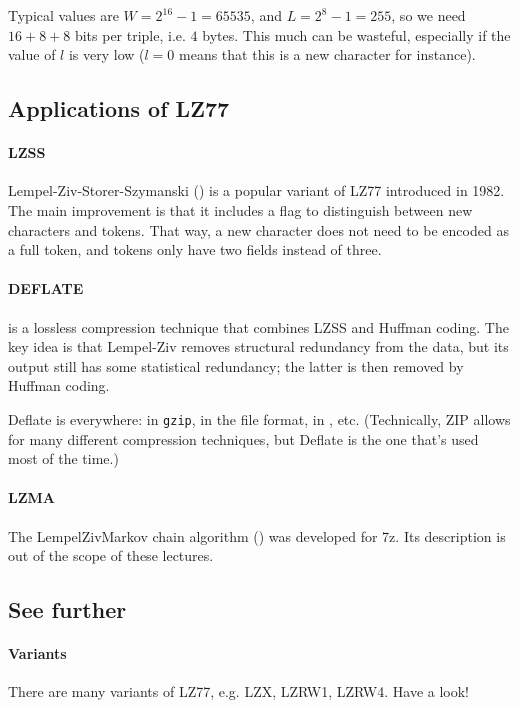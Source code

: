 \documentclass[a4paper, 11pt, openany]{book}
\begin{document}
Typical values are $W = 2^{16} - 1 = 65535$, and $L = 2^8 - 1 = 255$, so we need $16+8+8$ bits per triple, i.e. $4$ bytes. This much can be wasteful, especially if the value of $l$ is very low ($l=0$ means that this is a new character for instance).


\subsection{Applications of LZ77}

\paragraph{LZSS} Lempel-Ziv-Storer-Szymanski () is a popular variant of LZ77 introduced in 1982. The main improvement is that it includes a flag to distinguish between new characters and tokens. That way, a new character does not need to be encoded as a full token, and tokens only have two fields instead of three.

\paragraph{DEFLATE}  is a lossless compression technique that combines LZSS and Huffman coding. The key idea is that Lempel-Ziv removes structural redundancy from the data, but its output still has some statistical redundancy; the latter is then removed by Huffman coding.

Deflate is everywhere: in \texttt{gzip}, in the  file format, in , etc. (Technically, ZIP allows for many different compression techniques, but Deflate is the one that's used most of the time.)

\paragraph{LZMA} The LempelZivMarkov chain algorithm () was developed for 7z. Its description is out of the scope of these lectures.

\subsection{See further}

\paragraph{Variants} There are many variants of LZ77, e.g. LZX, LZRW1, LZRW4. Have a look!
\end{document}
